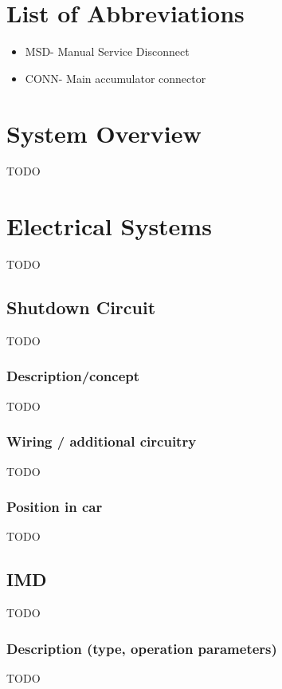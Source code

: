 \documentclass{article}
\begin{document}
\tableofcontents
{}

\newpage
\listoffigures
{}

\newpage
\listoftables
{}

\newpage
\section*{List of Abbreviations}
\begin{itemize}
    \item MSD- Manual Service Disconnect
    \item CONN- Main accumulator connector
\end{itemize}

\section{System Overview}
TODO

\section{Electrical Systems}
TODO

\subsection{Shutdown Circuit}
TODO

\subsubsection{Description/concept}
TODO

\subsubsection{Wiring / additional circuitry}
TODO

\subsubsection{Position in car}
TODO

\subsection{IMD}
TODO

\subsubsection{Description (type, operation parameters)}
TODO
\end{document}
